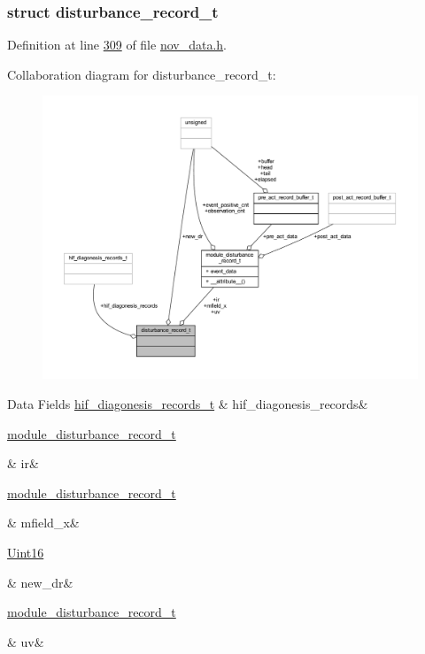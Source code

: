 \subsubsection{struct disturbance\+\_\+record\+\_\+t}


Definition at line \hyperlink{a00022_source_l00309}{309} of file \hyperlink{a00022_source}{nov\+\_\+data.\+h}.



Collaboration diagram for disturbance\+\_\+record\+\_\+t\+:\nopagebreak
\begin{figure}[H]
\begin{center}
\leavevmode
\includegraphics[width=350pt]{d8/d49/a00979}
\end{center}
\end{figure}
\begin{DoxyFields}{Data Fields}
\hypertarget{a00022_a7c8da86c63f709f97092f5e93d63d717}{\hyperlink{a00022_a4726b814166e222a6f13e21453f76d8d}{hif\+\_\+diagonesis\+\_\+records\+\_\+t}}\label{a00022_a7c8da86c63f709f97092f5e93d63d717}
&
hif\+\_\+diagonesis\+\_\+records&
\\
\hline

\hypertarget{a00022_a158b2957d77d3d89c153aa8f7d2c24aa}{\hyperlink{a00028}{module\+\_\+disturbance\+\_\+record\+\_\+t}}\label{a00022_a158b2957d77d3d89c153aa8f7d2c24aa}
&
ir&
\\
\hline

\hypertarget{a00022_a09e3379d2abb3f9e7baca2d70d830589}{\hyperlink{a00028}{module\+\_\+disturbance\+\_\+record\+\_\+t}}\label{a00022_a09e3379d2abb3f9e7baca2d70d830589}
&
mfield\+\_\+x&
\\
\hline

\hypertarget{a00022_a06567da877d94afe70f37fcb95f1c3ae}{\hyperlink{a00072_a59a9f6be4562c327cbfb4f7e8e18f08b}{Uint16}}\label{a00022_a06567da877d94afe70f37fcb95f1c3ae}
&
new\+\_\+dr&
\\
\hline

\hypertarget{a00022_a06b409cbaa5fcf126e93268387d3718d}{\hyperlink{a00028}{module\+\_\+disturbance\+\_\+record\+\_\+t}}\label{a00022_a06b409cbaa5fcf126e93268387d3718d}
&
uv&
\\
\hline

\end{DoxyFields}
\label{da/dc3/a00453}
\hypertarget{a00022_da/dc3/a00453}{}
